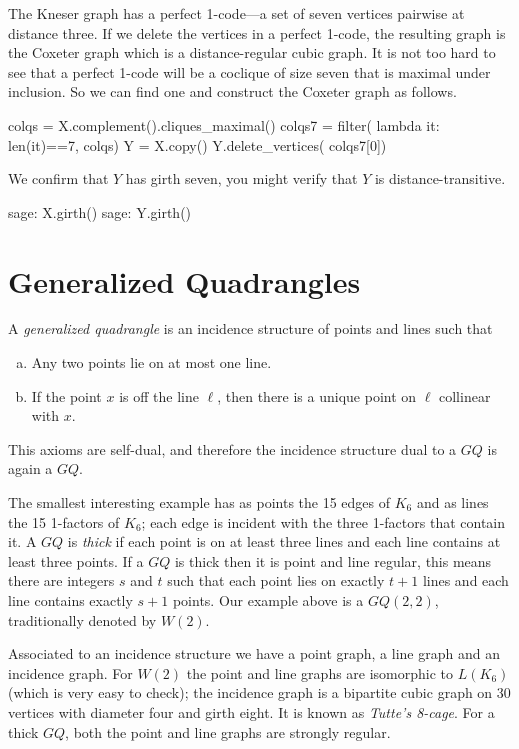 The Kneser graph has a perfect 1-code---a set of seven vertices pairwise at distance
three. If we delete the vertices in a perfect 1-code, the resulting graph
is the Coxeter graph which is a distance-regular cubic graph.
It is not too hard to see that a perfect 1-code will be a coclique of size seven
that is maximal under inclusion. So we can find one and construct the
Coxeter graph as follows.

\begin{sageblock}
    colqs = X.complement().cliques_maximal()
    colqs7 = filter( lambda it: len(it)==7, colqs)
    Y = X.copy()
    Y.delete_vertices( colqs7[0])
\end{sageblock}

We confirm that $Y$ has girth seven, you might verify that $Y$ is distance-transitive.
\begin{sageexample}
sage: X.girth()
sage: Y.girth()
\end{sageexample}


\section{Generalized Quadrangles}

A \textsl{generalized quadrangle} is an incidence structure of points
and lines such that
\begin{enumerate}[(a)]
    \item 
    Any two points lie on at most one line.
    \item
    If the point $x$ is off the line $\ell$, then there is a unique
    point on $\ell$ collinear with $x$.
\end{enumerate}
This axioms are self-dual, and therefore the incidence structure
dual to a $GQ$ is again a $GQ$.

The smallest interesting example has as points the 15 edges of $K_6$ and
as lines the 15 1-factors of $K_6$; each edge is incident with the three
1-factors that contain it. A $GQ$ is \textsl{thick} if each point is on at least 
three lines and each line contains at least three points. If a $GQ$ is thick then
it is point and line regular, this means there are integers $s$ and $t$ such that
each point lies on exactly $t+1$ lines and each line contains exactly $s+1$
points. Our example above is a $GQ(2,2)$, traditionally denoted by $W(2)$.

Associated to an incidence structure we have a point graph, a line graph
and an incidence graph.  For $W(2)$ the point and line graphs are isomorphic
to $L(K_6)$ (which is very easy to check); the incidence graph is
a bipartite cubic graph on 30 vertices with diameter four and girth eight.
It is known as \textsl{Tutte's 8-cage}. For a thick $GQ$, both the point
and line graphs are strongly regular.

